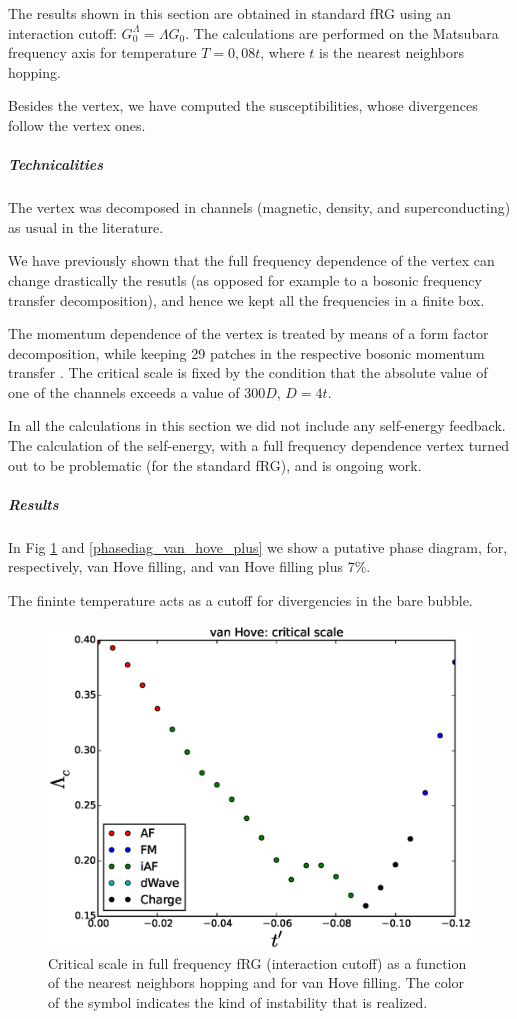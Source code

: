 The results shown in this section are obtained in standard fRG using an interaction cutoff: $G_0^\Lambda = \Lambda G_0$. The calculations are performed on the Matsubara frequency axis for temperature $T=0,08 t$, where $t$ is the nearest neighbors hopping.  

Besides the vertex, we have computed the susceptibilities, whose divergences follow the vertex ones. 

\subparagraph{Technicalities}

The vertex was decomposed in channels (magnetic, density, and superconducting) as usual in the literature. 

We have previously shown that the full frequency dependence of the vertex can change drastically the resutls (as opposed for example to a bosonic frequency transfer decomposition), and hence we kept all the frequencies in a finite box. 

The momentum dependence of the vertex is treated by means of a form factor decomposition, while keeping 29 patches in the respective bosonic momentum transfer . The critical scale is fixed by the condition that the absolute value of one of the channels exceeds a value of 300$D$, $D=4t$. 


In all the calculations in this section we did not include any self-energy feedback. The calculation of the self-energy, with a full frequency dependence vertex turned out to be problematic (for the standard fRG), and is ongoing work. 
 
 
\subparagraph{Results} 

In Fig \ref{phasediag_van_hove} and \ref{phasediag_van_hove_plus} we show  a putative phase diagram, for, respectively, van Hove filling, and van Hove filling plus 7\%. 

The fininte temperature acts as a cutoff for divergencies in the bare bubble. 

\begin{figure}
\includegraphics[scale=0.8]{vanHove_scan_critical_lambda_phi.eps}
\caption{Critical scale in full frequency fRG (interaction cutoff) as a function of the nearest neighbors hopping and for van Hove filling. The color of the symbol indicates the kind of instability that is realized.  } \label{phasediag_van_hove}

\end{figure}

